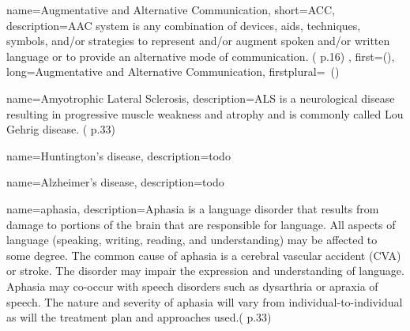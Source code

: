  {
	name={Augmentative and Alternative Communication}, 
	short={ACC},
	description={AAC system is any combination of devices, aids, techniques, symbols, and/or strategies to represent and/or augment spoken and/or written language or to provide an alternative mode of communication. (\cite{SLPathologies} p.16)
},
first={}(),
	long={Augmentative and Alternative Communication},
	firstplural={\glspluralsuffix\ (\glspluralsuffix )}
}

 {
	name={Amyotrophic Lateral Sclerosis}, 
	description={ALS is a neurological disease resulting in progressive muscle weakness and atrophy and is commonly called Lou Gehrig disease. (\cite{SLPathologies} p.33)
}%
}




 {
	name={Huntington's disease}, 
	description={todo}
}





 {
	name={Alzheimer's disease}, 
	description={todo}
}






 {
	name={aphasia}, 
	description={Aphasia is a language disorder that results from damage to portions of the brain that are responsible for language. All aspects of language (speaking, writing, reading, and understanding) may be affected to some degree. The common cause of aphasia is a cerebral vascular accident (CVA) or stroke. The disorder may impair the expression and understanding of language. Aphasia may co-occur with speech disorders such as dysarthria or apraxia of speech. The nature and severity of aphasia will vary from individual-to-individual as will the treatment plan and approaches used.(\cite{SLPathologies} p.33)
}
}


